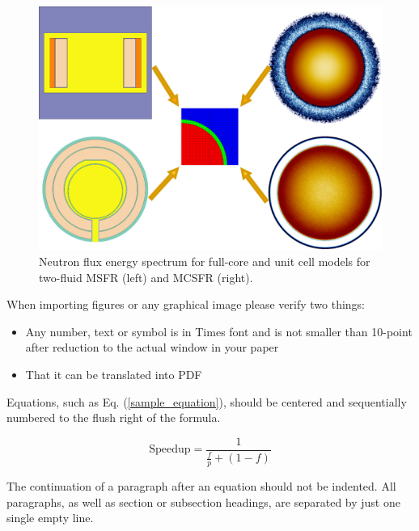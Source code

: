 \documentclass[letterpaper]{mandc2019}
\begin{document}
\begin{figure}[!htb]
  \centering
  \includegraphics[scale=0.35]{./Figures/fsmsrs.pdf}
  \caption{Neutron flux energy spectrum for full-core and unit cell models for two-fluid \gls{MSFR} (left) and \gls{MCSFR} (right).}   
  \label{fig:spectrum_msfr_mcsfr}
\end{figure}


When importing figures or any graphical image please verify two things:
\vspace{-0.65cm} %
\begin{itemize} \itemsep1pt \parskip0pt 
\item Any number, text or symbol is in Times font and is not smaller than 
  10-point after reduction to the actual window in your paper
\item That it can be translated into PDF
\end{itemize}

Equations, such as Eq. (\ref{sample_equation}), should be centered and 
sequentially numbered to the flush right of the formula.

\begin{equation}
  \label{sample_equation}
  \mathrm{Speedup}=\frac{1}{\frac{f}{p}+(1-f)}
\end{equation}

The continuation of a paragraph after an equation should not be indented.  
All paragraphs, as well as section or subsection headings, are separated by 
just one single empty line.
\end{document}
